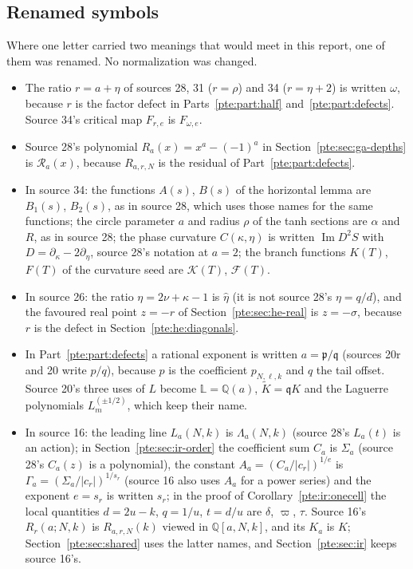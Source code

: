 \documentclass[11pt,a4paper]{article}
\numberwithin{equation}{section}
\theoremstyle{definition}
\theoremstyle{plain}
\newcommand{\fp}{\mathfrak p}
\newcommand{\fq}{\mathfrak q}
\begin{document}
\subsection{Renamed symbols}\label{pte:sec:renames}
Where one letter carried two meanings that would meet in this report, one of them was renamed. No normalization was changed.
\begin{itemize}
\item The ratio $r=a+\eta$ of sources 28, 31 ($r=\rho$) and 34 ($r=\eta+2$) is written $\omega$, because $r$ is the factor defect in Parts~\ref{pte:part:half} and~\ref{pte:part:defects}. Source 34's critical map $F_{r,e}$ is $F_{\omega,e}$.
\item Source 28's polynomial $R_a(x)=x^a-(-1)^a$ in Section~\ref{pte:sec:ga-depths} is $\mathcal R_a(x)$, because $R_{a,r,N}$ is the residual of Part~\ref{pte:part:defects}.
\item In source 34: the functions $A(s)$, $B(s)$ of the horizontal lemma are $B_1(s)$, $B_2(s)$, as in source 28, which uses those names for the same functions; the circle parameter $a$ and radius $\rho$ of the tanh sections are $\alpha$ and $R$, as in source 28; the phase curvature $C(\kappa,\eta)$ is written $\operatorname{Im}D^2S$ with $D=\partial_\kappa-2\partial_\eta$, source 28's notation at $a=2$; the branch functions $K(T)$, $F(T)$ of the curvature seed are $\mathcal K(T)$, $\mathcal F(T)$.
\item In source 26: the ratio $\eta=2\nu+\kappa-1$ is $\hat\eta$ (it is not source 28's $\eta=q/d$), and the favoured real point $z=-r$ of Section~\ref{pte:sec:he-real} is $z=-\sigma$, because $r$ is the defect in Section~\ref{pte:he:diagonals}.
\item In Part~\ref{pte:part:defects} a rational exponent is written $a=\fp/\fq$ (sources 20r and 20 write $p/q$), because $p$ is the coefficient $p_{N,\ell,k}$ and $q$ the tail offset. Source 20's three uses of $L$ become $\mathbb L=\mathbb Q(a)$, $\widetilde K=\fq K$ and the Laguerre polynomials $L_m^{(\pm1/2)}$, which keep their name.
\item In source 16: the leading line $L_a(N,k)$ is $\Lambda_a(N,k)$ (source 28's $L_a(t)$ is an action); in Section~\ref{pte:sec:ir-order} the coefficient sum $C_a$ is $\Sigma_a$ (source 28's $C_a(z)$ is a polynomial), the constant $A_a=(C_a/|c_r|)^{1/e}$ is $\Gamma_a=(\Sigma_a/|c_r|)^{1/s_r}$ (source 16 also uses $A_a$ for a power series) and the exponent $e=s_r$ is written $s_r$; in the proof of Corollary~\ref{pte:ir:onecell} the local quantities $d=2u-k$, $q=1/u$, $t=d/u$ are $\delta$, $\varpi$, $\tau$. Source 16's $R_r(a;N,k)$ is $R_{a,r,N}(k)$ viewed in $\mathbb Q[a,N,k]$, and its $K_a$ is $K$; Section~\ref{pte:sec:shared} uses the latter names, and Section~\ref{pte:sec:ir} keeps source 16's.
\end{itemize}
\end{document}

